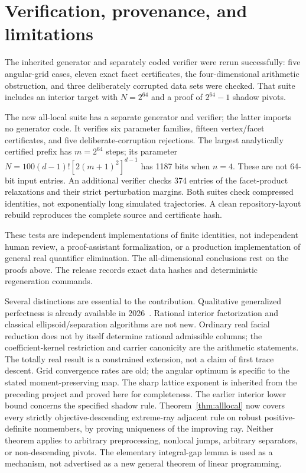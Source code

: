 \section{Verification, provenance, and limitations}\label{sec:verification}
The inherited generator and separately coded verifier were rerun successfully: five angular-grid cases, eleven exact facet certificates, the four-dimensional arithmetic obstruction, and three deliberately corrupted data sets were checked. That suite includes an interior target with $N=2^{64}$ and a proof of $2^{64}-1$ shadow pivots.

The new all-local suite has a separate generator and verifier; the latter imports no generator code. It verifies six parameter families, fifteen vertex/facet certificates, and five deliberate-corruption rejections. The largest analytically certified prefix has $m=2^{64}$ steps; its parameter $N=100(d-1)![2(m+1)^2]^{d-1}$ has 1187 bits when $n=4$. These are not 64-bit input entries. An additional verifier checks 374 entries of the facet-product relaxations and their strict perturbation margins. Both suites check compressed identities, not exponentially long simulated trajectories. A clean repository-layout rebuild reproduces the complete source and certificate hash.

These tests are independent implementations of finite identities, not independent human review, a proof-assistant formalization, or a production implementation of general real quantifier elimination. The all-dimensional conclusions rest on the proofs above. The release records exact data hashes and deterministic regeneration commands.

Several distinctions are essential to the contribution. Qualitative generalized perfectness is already available in 2026~\cite{OS26}. Rational interior factorization and classical ellipsoid/separation algorithms are not new. Ordinary real facial reduction does not by itself determine rational admissible columns; the coefficient-kernel restriction and carrier canonicity are the arithmetic statements. The totally real result is a constrained extension, not a claim of first trace descent. Grid convergence rates are old; the angular optimum is specific to the stated moment-preserving map. The sharp lattice exponent is inherited from the preceding project and proved here for completeness. The earlier interior lower bound concerns the specified shadow rule. Theorem~\ref{thm:alllocal} now covers every strictly objective-descending extreme-ray adjacent rule on robust positive-definite nonmembers, by proving uniqueness of the improving ray. Neither theorem applies to arbitrary preprocessing, nonlocal jumps, arbitrary separators, or non-descending pivots. The elementary integral-gap lemma is used as a mechanism, not advertised as a new general theorem of linear programming.

